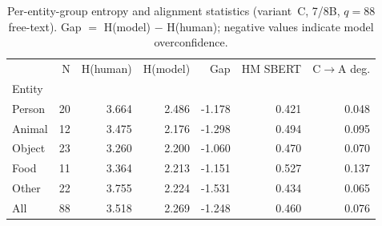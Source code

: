 \begin{table}[t]
\centering
\caption{Per-entity-group entropy and alignment statistics (variant~C, 7/8B, $q=88$ free-text). Gap $=$ H(model) $-$ H(human); negative values indicate model overconfidence.}
\label{tab:entropy_entity}
\small
\begin{tabular}{lrrrrrr}
\toprule
 & N & H(human) & H(model) & Gap & HM SBERT & C$\to$A deg. \\
Entity &  &  &  &  &  &  \\
\midrule
Person & 20 & 3.664 & 2.486 & -1.178 & 0.421 & 0.048 \\
Animal & 12 & 3.475 & 2.176 & -1.298 & 0.494 & 0.095 \\
Object & 23 & 3.260 & 2.200 & -1.060 & 0.470 & 0.070 \\
Food & 11 & 3.364 & 2.213 & -1.151 & 0.527 & 0.137 \\
Other & 22 & 3.755 & 2.224 & -1.531 & 0.434 & 0.065 \\
All & 88 & 3.518 & 2.269 & -1.248 & 0.460 & 0.076 \\
\bottomrule
\end{tabular}
\end{table}
